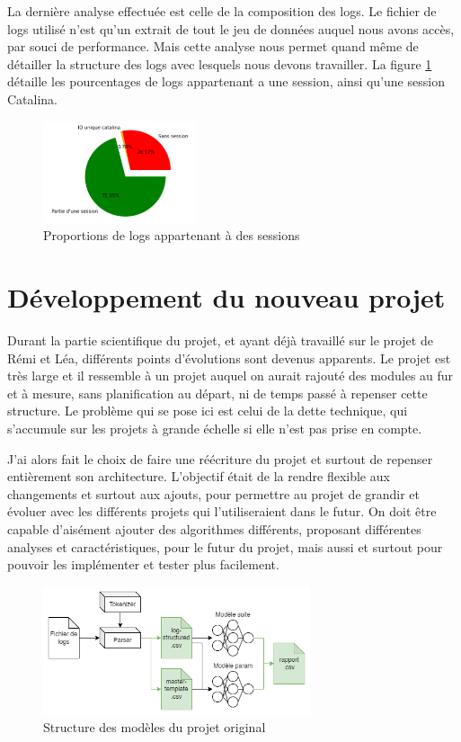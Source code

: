 \documentclass[openany, 11pt]{memoir}
\begin{document}
La dernière analyse effectuée est celle de la composition des \glspl{log}. Le fichier de logs utilisé n'est qu'un extrait de tout le jeu de données auquel nous avons accès, par souci de performance. Mais cette analyse nous permet quand même de détailler la structure des logs avec lesquels nous devons travailler. La figure \ref{proportionsess} détaille les pourcentages de logs appartenant a une session, ainsi qu'une session Catalina.

\begin{figure}[ht]
	\centering
	\includegraphics[width=0.4\textwidth]{images/proportionsess.png}
	\caption{Proportions de logs appartenant à des sessions}
	\label{proportionsess}
\end{figure}

\newpage
\section{Développement du nouveau projet}

Durant la partie scientifique du projet, et ayant déjà travaillé sur le projet de Rémi et Léa, différents points d'évolutions sont devenus apparents. Le projet est très large et il ressemble à un projet auquel on aurait rajouté des modules au fur et à mesure, sans planification au départ, ni de temps passé à repenser cette structure. Le problème qui se pose ici est celui de la dette technique, qui s'accumule sur les projets à grande échelle si elle n'est pas prise en compte.

J'ai alors fait le choix de faire une réécriture du projet et surtout de repenser entièrement son architecture. L'objectif était de la rendre flexible aux changements et surtout aux ajouts, pour permettre au projet de grandir et évoluer avec les différents projets qui l'utiliseraient dans le futur. On doit être capable d'aisément ajouter des algorithmes différents, proposant différentes analyses et caractéristiques, pour le futur du projet, mais aussi et surtout pour pouvoir les implémenter et tester plus facilement.

\begin{figure}[ht]
	\centering
	\includegraphics[width=0.7\textwidth]{images/analyselogs.png}
	\caption{Structure des modèles du projet original}
	\label{analyselogs}
\end{figure}
\end{document}
